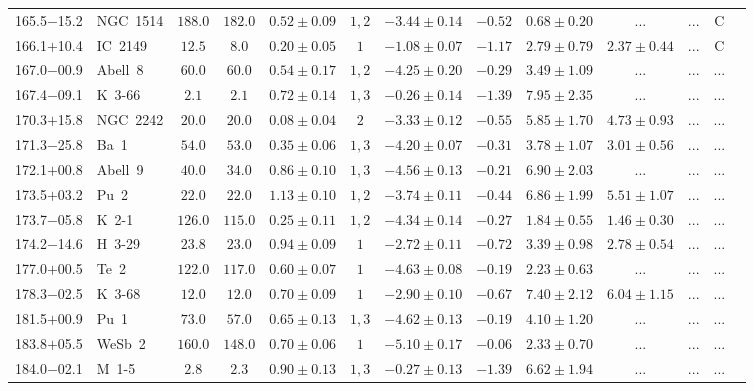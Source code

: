 \documentclass[useAMS]{mn2e}
\begin{document}
\begin{center}
{\begin{longtable}{llccccccccccc}
165.5$-$15.2&NGC~1514&$     188.0$&$     182.0$&$0.52 \pm 0.09$&$1,2$&$-3.44 \pm 0.14$&$     -0.52$&$0.68 \pm 0.20$&$...$&$...$&C\\
166.1$+$10.4&IC~2149&$      12.5$&$       8.0$&$0.20 \pm 0.05$&$1$&$-1.08 \pm 0.07$&$     -1.17$&$2.79 \pm 0.79$&$2.37 \pm 0.44$&$...$&C\\
167.0$-$00.9&Abell~8&$      60.0$&$      60.0$&$0.54 \pm 0.17$&$1,2$&$-4.25 \pm 0.20$&$     -0.29$&$3.49 \pm 1.09$&$...$&$...$&...\\
167.4$-$09.1&K~3-66&$       2.1$&$       2.1$&$0.72 \pm 0.14$&$1,3$&$-0.26 \pm 0.14$&$     -1.39$&$7.95 \pm 2.35$&$...$&$...$&...\\
170.3$+$15.8&NGC~2242&$      20.0$&$      20.0$&$0.08 \pm 0.04$&$2$&$-3.33 \pm 0.12$&$     -0.55$&$5.85 \pm 1.70$&$4.73 \pm 0.93$&$...$&...\\
171.3$-$25.8&Ba~1&$      54.0$&$      53.0$&$0.35 \pm 0.06$&$1,3$&$-4.20 \pm 0.07$&$     -0.31$&$3.78 \pm 1.07$&$3.01 \pm 0.56$&$...$&...\\
172.1$+$00.8&Abell~9&$      40.0$&$      34.0$&$0.86 \pm 0.10$&$1,3$&$-4.56 \pm 0.13$&$     -0.21$&$6.90 \pm 2.03$&$...$&$...$&...\\
173.5$+$03.2&Pu~2&$      22.0$&$      22.0$&$1.13 \pm 0.10$&$1,2$&$-3.74 \pm 0.11$&$     -0.44$&$6.86 \pm 1.99$&$5.51 \pm 1.07$&$...$&...\\
173.7$-$05.8&K~2-1&$     126.0$&$     115.0$&$0.25 \pm 0.11$&$1,2$&$-4.34 \pm 0.14$&$     -0.27$&$1.84 \pm 0.55$&$1.46 \pm 0.30$&$...$&...\\
174.2$-$14.6&H~3-29&$      23.8$&$      23.0$&$0.94 \pm 0.09$&$1$&$-2.72 \pm 0.11$&$     -0.72$&$3.39 \pm 0.98$&$2.78 \pm 0.54$&$...$&...\\
177.0$+$00.5&Te~2&$     122.0$&$     117.0$&$0.60 \pm 0.07$&$1$&$-4.63 \pm 0.08$&$     -0.19$&$2.23 \pm 0.63$&$...$&$...$&...\\
178.3$-$02.5&K~3-68&$      12.0$&$      12.0$&$0.70 \pm 0.09$&$1$&$-2.90 \pm 0.10$&$     -0.67$&$7.40 \pm 2.12$&$6.04 \pm 1.15$&$...$&...\\
181.5$+$00.9&Pu~1&$      73.0$&$      57.0$&$0.65 \pm 0.13$&$1,3$&$-4.62 \pm 0.13$&$     -0.19$&$4.10 \pm 1.20$&$...$&$...$&...\\
183.8$+$05.5&WeSb~2&$     160.0$&$     148.0$&$0.70 \pm 0.06$&$1$&$-5.10 \pm 0.17$&$     -0.06$&$2.33 \pm 0.70$&$...$&$...$&...\\
184.0$-$02.1&M~1-5&$       2.8$&$       2.3$&$0.90 \pm 0.13$&$1,3$&$-0.27 \pm 0.13$&$     -1.39$&$6.62 \pm 1.94$&$...$&$...$&...\\

\end{longtable}}
\end{center}
\end{document}
